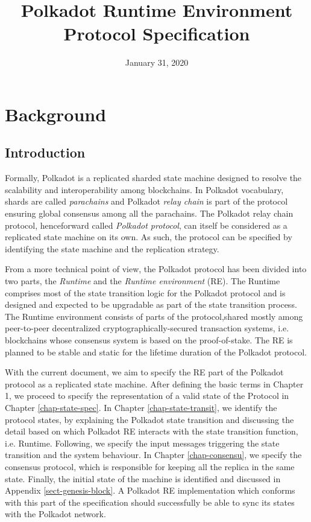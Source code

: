 \documentclass{book}
\newcommand{\tmem}[1]{{\em #1\/}}
\newcommand{\tmtextit}[1]{{\itshape{#1}}}
\providecommand{\tmem}[1]{\tmtextit{#1}}
\providecommand{\tmtextit}[1]{\tmtextit{#1}}
\begin{document}
\title{
  Polkadot Runtime Environment\\
  {\Large Protocol Specification}
}

\date{January 31, 2020}

\maketitle

{\tableofcontents}

\chapter{Background}

\section{Introduction}

Formally, Polkadot is a replicated sharded state machine designed to resolve
the scalability and interoperability among blockchains. In Polkadot
vocabulary, shards are called {\tmem{parachains}} and Polkadot {\tmem{relay
chain}} is part of the protocol ensuring global consensus among all the
parachains. The Polkadot relay chain protocol, henceforward called
{\tmem{Polkadot protocol}}, can itself be considered as a replicated state
machine on its own. As such, the protocol can be specified by identifying the
state machine and the replication strategy.

From a more technical point of view, the Polkadot protocol has been divided
into two parts, the {\tmem{Runtime}} and the {\tmem{Runtime environment}}
(RE). The Runtime comprises most of the state transition logic for the
Polkadot protocol and is designed and expected to be upgradable as part of the
state transition process. The Runtime environment consists of parts of the
protocol,\quad shared mostly among peer-to-peer decentralized
cryptographically-secured transaction systems, i.e. blockchains whose
consensus system is based on the proof-of-stake. The RE is planned to be
stable and static for the lifetime duration of the Polkadot protocol.

With the current document, we aim to specify the RE part of the Polkadot
protocol as a replicated state machine. After defining the basic terms in
Chapter 1, we proceed to specify the representation of a valid state of the
Protocol in Chapter \ref{chap-state-spec}. In Chapter
\ref{chap-state-transit}, we identify the protocol states, by explaining the
Polkadot state transition and discussing the detail based on which Polkadot RE
interacts with the state transition function, i.e. Runtime. Following, we
specify the input messages triggering the state transition and the system
behaviour. In Chapter \ref{chap-consensu}, we specify the consensus protocol,
which is responsible for keeping all the replica in the same state. Finally,
the initial state of the machine is identified and discussed in Appendix
\ref{sect-genesis-block}. A Polkadot RE implementation which conforms with
this part of the specification should successfully be able to sync its states
with the Polkadot network.
\end{document}
